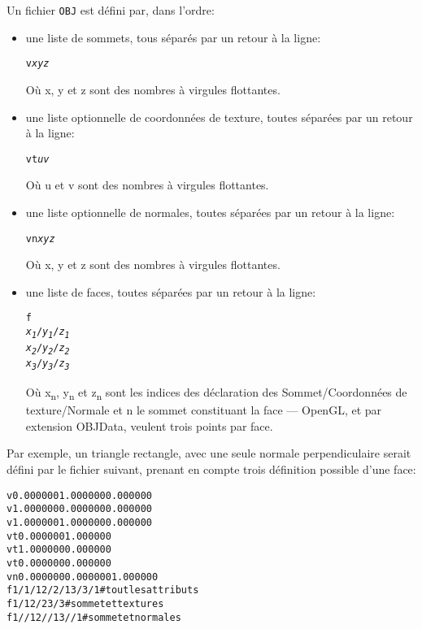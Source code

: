 \documentclass[11pt, a4paper, titlepage]{article}
\begin{document}
Un fichier \texttt{OBJ} est défini par, dans l'ordre:
\begin{itemize}

\item une liste de sommets, tous séparés par un retour à la ligne:
  \begin{alltt}
    v \emph{x} \emph{y} \emph{z}
  \end{alltt}
  Où x, y et z sont des nombres à virgules flottantes.

\item une liste optionnelle de coordonnées de texture, toutes séparées
  par un retour à la ligne:
  \begin{alltt}
    vt \emph{u} \emph{v}
  \end{alltt}
  Où u et v sont des nombres à virgules flottantes.

\item une liste optionnelle de normales, toutes séparées par un retour
  à la ligne:
  \begin{alltt}
    vn \emph{x} \emph{y} \emph{z}
  \end{alltt}
  Où x, y et z sont des nombres à virgules flottantes.

\item une liste de faces, toutes séparées par un retour à la ligne:
  \begin{alltt}
    f
    \emph{x\textsubscript{1}}/\emph{y\textsubscript{1}}/\emph{z\textsubscript{1}}
    \emph{x\textsubscript{2}}/\emph{y\textsubscript{2}}/\emph{z\textsubscript{2}}
    \emph{x\textsubscript{3}}/\emph{y\textsubscript{3}}/\emph{z\textsubscript{3}}
  \end{alltt}
  Où x\textsubscript{n}, y\textsubscript{n} et z\textsubscript{n} sont
  les indices des déclaration des Sommet/Coordonnées de
  texture/Normale et n
  le sommet constituant la face --- OpenGL, et par extension OBJData, veulent trois points par face.\\

\end{itemize}

Par exemple, un triangle rectangle, avec une seule normale
perpendiculaire serait défini par le fichier suivant, prenant en
compte trois définition possible d'une face:
\begin{alltt}
v 0.000000 1.000000 0.000000 
v 1.000000 0.000000 0.000000
v 1.000000 1.000000 0.000000
vt 0.000000 1.000000
vt 1.000000 0.000000
vt 0.000000 0.000000 
vn 0.000000 0.000000 1.000000
f 1/1/1 2/2/1 3/3/1 # tout les attributs 
f 1/1 2/2 3/3       # sommet et textures
f 1//1 2//1 3//1    # sommet et normales
\end{alltt}
\end{document}
